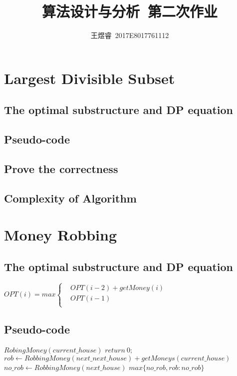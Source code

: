 \documentclass{article}
\author{王煜睿\ 2017E8017761112}
\title{算法设计与分析\ 第二次作业}
\begin{document}
\begin{CJK*}{UTF8}{gbsn}
\maketitle

\clearpage
\section{Largest Divisible Subset}
\subsection{The optimal substructure and DP equation}
\subsection{Pseudo-code}
\subsection{Prove the correctness}
\subsection{Complexity of Algorithm}

\clearpage
\section{Money Robbing}
	\subsection{The optimal substructure and DP equation}
	$
		OPT(i) = max
		\left\{
		\begin{aligned}
		&OPT(i-2) + getMoney(i)  \\
		&OPT(i-1) \\
		\end{aligned}
		\right.
	$

	\subsection{Pseudo-code}
	
		\begin{algorithm}
			\begin{algorithmic}
				\STATE $RobingMoney(current\_house)$
					\RETURN $return\ 0;$
				\ENDIF
				\STATE $rob \gets RobbingMoney(next\_next\_house) + getMoneys(current\_house)$
				\STATE	$no\_rob \gets RobbingMoney(next\_house)$
				\RETURN $max\{no\_rob,rob:no\_rob\}$
			\end{algorithmic}
		\end{algorithm}
		

\end{CJK*}
\end{document}
